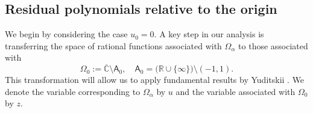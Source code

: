 \documentclass[12pt,oneside,reqno]{amsart}
\theoremstyle{definition}
\numberwithin{equation}{section}
\newcommand{\R}{{\mathbb R}}
\newcommand{\C}{{\mathbb C}}
\newcommand{\D}{{\mathbb D}}
\newcommand{\E}{{\mathsf E}}
\newcommand{\sfA}{\mathsf{A}}
\newcommand{\RS}{\overline{\C}}
\newcommand{\bbC}{\mathbb{C}}
\begin{document}


\subsection{Residual polynomials relative to the origin}
\label{subsec:res_origin}
We begin by considering the case $u_0 =0$. A key step in our analysis is transferring the space of rational functions associated with $\Omega_\alpha $ to those associated with 
\begin{equation}
	\Omega_0 := \RS \setminus \sfA_0, \quad \sfA_0 = \bigl( \R \cup \{ \infty \} \bigr) \setminus (-1,1).
\end{equation}
This transformation will allow us to apply fundamental results by Yuditskii \cite{yuditskii99}. 
We denote the variable corresponding to $\Omega_\alpha$ by $u$ and the variable associated with $\Omega_0$ by $z$. 
\end{document}
